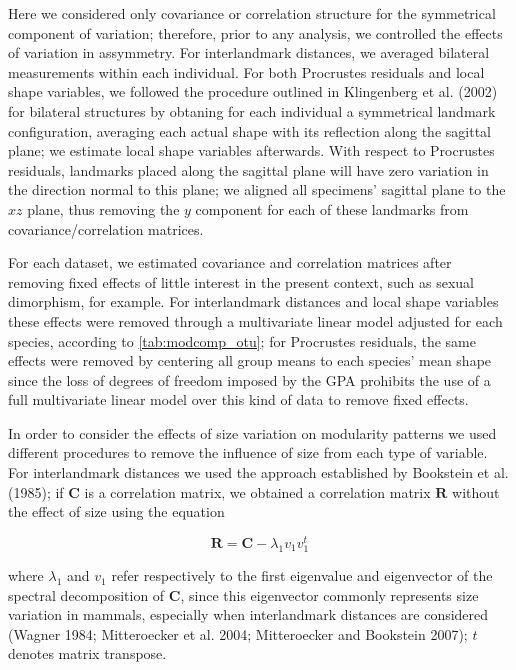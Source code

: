 \documentclass[12pt,]{article}
\begin{document}
Here we considered only covariance or correlation structure for the
symmetrical component of variation; therefore, prior to any analysis, we
controlled the effects of variation in assymmetry. For interlandmark
distances, we averaged bilateral measurements within each individual.
For both Procrustes residuals and local shape variables, we followed the
procedure outlined in Klingenberg et al. (2002) for bilateral structures
by obtaning for each individual a symmetrical landmark configuration,
averaging each actual shape with its reflection along the sagittal
plane; we estimate local shape variables afterwards. With respect to
Procrustes residuals, landmarks placed along the sagittal plane will
have zero variation in the direction normal to this plane; we aligned
all specimens' sagittal plane to the $xz$ plane, thus removing the $y$
component for each of these landmarks from covariance/correlation
matrices.

For each dataset, we estimated covariance and correlation matrices after
removing fixed effects of little interest in the present context, such
as sexual dimorphism, for example. For interlandmark distances and local
shape variables these effects were removed through a multivariate linear
model adjusted for each species, according to \autoref{tab:modcomp_otu};
for Procrustes residuals, the same effects were removed by centering all
group means to each species' mean shape since the loss of degrees of
freedom imposed by the GPA prohibits the use of a full multivariate
linear model over this kind of data to remove fixed effects.

In order to consider the effects of size variation on modularity
patterns we used different procedures to remove the influence of size
from each type of variable. For interlandmark distances we used the
approach established by Bookstein et al. (1985); if $\mathbf{C}$ is a
correlation matrix, we obtained a correlation matrix $\mathbf{R}$
without the effect of size using the equation

\begin{equation}
\mathbf{R} = \mathbf{C} - \lambda_1 v_1 v^{t}_1
\label{eq:iso}
\end{equation}

where $\lambda_1$ and $v_1$ refer respectively to the first eigenvalue
and eigenvector of the spectral decomposition of $\mathbf{C}$, since
this eigenvector commonly represents size variation in mammals,
especially when interlandmark distances are considered (Wagner 1984;
Mitteroecker et al. 2004; Mitteroecker and Bookstein 2007); $t$ denotes
matrix transpose.
\end{document}
